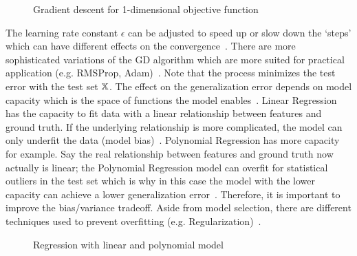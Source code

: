 \begin{figure}
    \centering
    
    \caption{Gradient descent for 1-dimensional objective function\label{fig:grad-desc}}
\end{figure}
The learning rate constant $\epsilon$ can be adjusted to speed up or slow down the `steps' which
can have different effects on the convergence~\citep{goodfellow_deep_2016}.
There are more sophisticated variations of the \ac{GD} algorithm which are more suited for practical
application (e.g. RMSProp, Adam)~\citep{geron_hands-machine_2017}.
Note that the process minimizes the test error with the test set $\mathbb{X}$.
The effect on the generalization error depends on model capacity which is the space of functions
the model enables~\citep{goodfellow_deep_2016}.
Linear Regression has the capacity to fit data with a linear relationship between features and
ground truth.
If the underlying relationship is more complicated, the model can only underfit the data (model
bias)~\citep{goodfellow_deep_2016}.
Polynomial Regression has more capacity for example.
Say the real relationship between features and ground truth now actually is linear;
the Polynomial Regression model can overfit for statistical outliers in the test set which is why
in this case the model with the lower capacity can achieve a lower generalization
error~\citep{geron_hands-machine_2017}.
Therefore, it is important to improve the bias/variance tradeoff.
Aside from model selection, there are different techniques used to prevent overfitting (e.g.
Regularization)~\citep{goodfellow_deep_2016}.
\begin{figure}[h]
    \centering
    \caption{Regression with linear and polynomial model\label{fig:examples}}
\end{figure}

